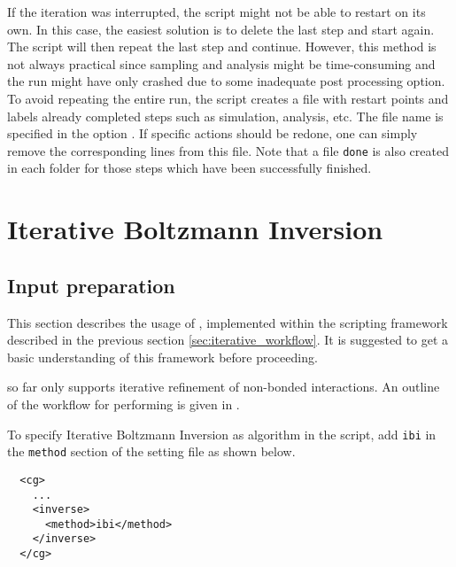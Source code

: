 If the iteration was interrupted, the script  might not be able to restart on its own. In this case, the easiest solution is to delete the last step and start again. The script will then repeat the last step and continue. However, this method is not always practical since sampling and analysis might be time-consuming and the run might have only crashed due to some inadequate post processing option. To avoid repeating the entire run, the script  creates a file with restart points and labels already completed steps such as simulation, analysis, etc. The file name is specified in the option . If specific actions should be redone, one can simply remove the corresponding lines from this file. Note that a file \texttt{done} is also created in each folder for those steps which have been successfully finished.



\section{Iterative Boltzmann Inversion}
\subsection{Input preparation}
This section describes the usage of \ibi, implemented within the scripting framework described in the previous section \ref{sec:iterative_workflow}. It is suggested to get a basic understanding of this framework before proceeding.

\ibi so far only supports iterative refinement of non-bonded interactions. An outline of the workflow for performing \ibi is given in .

To specify Iterative Boltzmann Inversion as algorithm in the script, add \texttt{ibi} in the \texttt{method} section of the \xml setting file as shown below.

\begin{lstlisting}
  <cg>
    ...
    <inverse>
      <method>ibi</method>
    </inverse>
  </cg>
\end{lstlisting}




